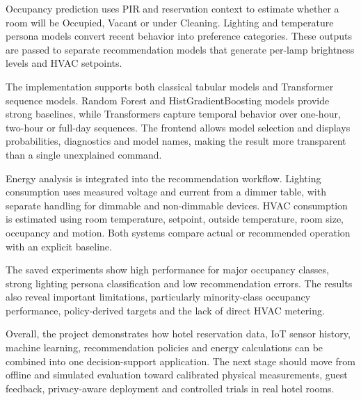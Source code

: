 Occupancy prediction uses PIR and reservation context to estimate whether a
room will be Occupied, Vacant or under Cleaning. Lighting and temperature
persona models convert recent behavior into preference categories. These
outputs are passed to separate recommendation models that generate per-lamp
brightness levels and HVAC setpoints.

The implementation supports both classical tabular models and Transformer
sequence models. Random Forest and HistGradientBoosting models provide strong
baselines, while Transformers capture temporal behavior over one-hour,
two-hour or full-day sequences. The frontend allows model selection and
displays probabilities, diagnostics and model names, making the result more
transparent than a single unexplained command.

Energy analysis is integrated into the recommendation workflow. Lighting
consumption uses measured voltage and current from a dimmer table, with
separate handling for dimmable and non-dimmable devices. HVAC consumption is
estimated using room temperature, setpoint, outside temperature, room size,
occupancy and motion. Both systems compare actual or recommended operation
with an explicit baseline.

The saved experiments show high performance for major occupancy classes,
strong lighting persona classification and low recommendation errors. The
results also reveal important limitations, particularly minority-class
occupancy performance, policy-derived targets and the lack of direct HVAC
metering.

Overall, the project demonstrates how hotel reservation data, IoT sensor
history, machine learning, recommendation policies and energy calculations can
be combined into one decision-support application. The next stage should move
from offline and simulated evaluation toward calibrated physical measurements,
guest feedback, privacy-aware deployment and controlled trials in real hotel
rooms.
